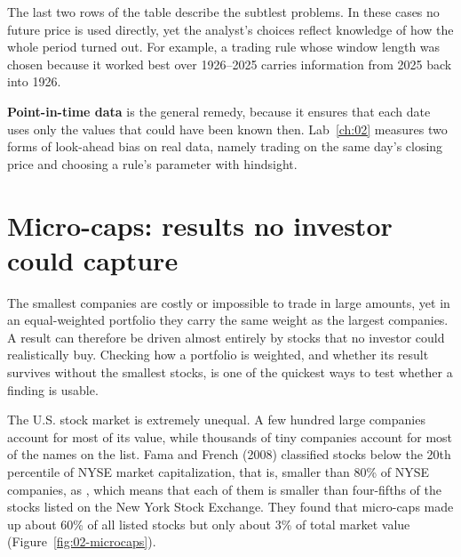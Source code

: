 The last two rows of the table describe the subtlest problems. In these cases no future price is used directly, yet the analyst's choices reflect knowledge of how the whole period turned out. For example, a trading rule whose window length was chosen because it worked best over 1926--2025 carries information from 2025 back into 1926.

\textbf{Point-in-time data} is the general remedy, because it ensures that each date uses only the values that could have been known then. Lab~\ref{ch:02} measures two forms of look-ahead bias on real data, namely trading on the same day's closing price and choosing a rule's parameter with hindsight.

\section{Micro-caps: results no investor could capture}
\label{sec:02-microcaps}

The smallest companies are costly or impossible to trade in large amounts, yet in an equal-weighted portfolio they carry the same weight as the largest companies. A result can therefore be driven almost entirely by stocks that no investor could realistically buy. Checking how a portfolio is weighted, and whether its result survives without the smallest stocks, is one of the quickest ways to test whether a finding is usable.

The U.S. stock market is extremely unequal. A few hundred large companies account for most of its value, while thousands of tiny companies account for most of the names on the list. Fama and French (2008) classified stocks below the 20th percentile of NYSE market capitalization, that is, smaller than 80\% of NYSE companies, as , which means that each of them is smaller than four-fifths of the stocks listed on the New York Stock Exchange. They found that micro-caps made up about 60\% of all listed stocks but only about 3\% of total market value (Figure~\ref{fig:02-microcaps}).




